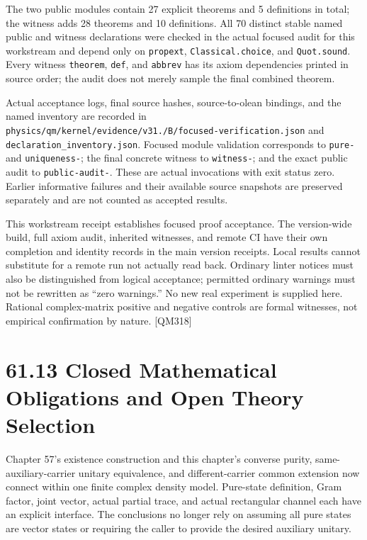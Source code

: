 \documentclass[
  11pt,
  oneside]{book}
\begin{document}
The two public modules contain 27 explicit theorems and 5 definitions in
total; the witness adds 28 theorems and 10 definitions. All 70 distinct
stable named public and witness declarations were checked in the actual
focused audit for this workstream and depend only on \texttt{propext},
\texttt{Classical.\allowbreak choice}, and \texttt{Quot.\allowbreak sound}. Every witness
\texttt{theorem}, \texttt{def}, and \texttt{abbrev} has its axiom
dependencies printed in source order; the audit does not merely sample
the final combined theorem.

Actual acceptance logs, final source hashes, source-to-olean bindings,
and the named inventory are recorded in
\texttt{physics/\allowbreak qm/\allowbreak kernel/\allowbreak evidence/\allowbreak v31./\allowbreak B/\allowbreak focused-\allowbreak verification.\allowbreak json}
and \texttt{declaration\_\allowbreak inventory.\allowbreak json}. Focused module validation
corresponds to \texttt{pure-} and \texttt{uniqueness-}; the final
concrete witness to \texttt{witness-}; and the exact public audit to
\texttt{public-\allowbreak audit-}. These are actual invocations with exit status
zero. Earlier informative failures and their available source snapshots
are preserved separately and are not counted as accepted results.

This workstream receipt establishes focused proof acceptance. The
version-wide build, full axiom audit, inherited witnesses, and remote CI
have their own completion and identity records in the main version
receipts. Local results cannot substitute for a remote run not actually
read back. Ordinary linter notices must also be distinguished from
logical acceptance; permitted ordinary warnings must not be rewritten as
``zero warnings.'' No new real experiment is supplied here. Rational
complex-matrix positive and negative controls are formal witnesses, not
empirical confirmation by nature. {[}QM318{]}

\section{61.13 Closed Mathematical Obligations and Open Theory
Selection}

Chapter 57's existence construction and this chapter's converse purity,
same-auxiliary-carrier unitary equivalence, and different-carrier common
extension now connect within one finite complex density model.
Pure-state definition, Gram factor, joint vector, actual partial trace,
and actual rectangular channel each have an explicit interface. The
conclusions no longer rely on assuming all pure states are vector states
or requiring the caller to provide the desired auxiliary unitary.
\end{document}
